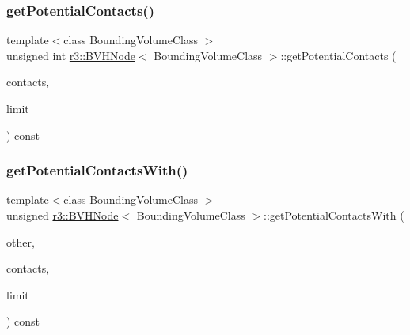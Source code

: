 \subsubsection{\texorpdfstring{get\+Potential\+Contacts()}{getPotentialContacts()}}
{\footnotesize\ttfamily template$<$class Bounding\+Volume\+Class $>$ \\
unsigned int \mbox{\hyperlink{classr3_1_1_b_v_h_node}{r3\+::\+B\+V\+H\+Node}}$<$ Bounding\+Volume\+Class $>$\+::get\+Potential\+Contacts (\begin{DoxyParamCaption}\item[{\mbox{\hyperlink{structr3_1_1_potential_contacts}{Potential\+Contacts}} $\ast$}]{contacts,  }\item[{unsigned int}]{limit }\end{DoxyParamCaption}) const}

\mbox{\label{classr3_1_1_b_v_h_node_aca88cf5bd4b1c4981198cec816f122e8}} 
\subsubsection{\texorpdfstring{get\+Potential\+Contacts\+With()}{getPotentialContactsWith()}}
{\footnotesize\ttfamily template$<$class Bounding\+Volume\+Class $>$ \\
unsigned \mbox{\hyperlink{classr3_1_1_b_v_h_node}{r3\+::\+B\+V\+H\+Node}}$<$ Bounding\+Volume\+Class $>$\+::get\+Potential\+Contacts\+With (\begin{DoxyParamCaption}\item[{\mbox{\hyperlink{classr3_1_1_b_v_h_node}{B\+V\+H\+Node}}$<$ Bounding\+Volume\+Class $>$ $\ast$}]{other,  }\item[{\mbox{\hyperlink{structr3_1_1_potential_contacts}{Potential\+Contacts}} $\ast$}]{contacts,  }\item[{unsigned}]{limit }\end{DoxyParamCaption}) const\hspace{0.3cm}{\ttfamily [protected]}}

\mbox{\label{classr3_1_1_b_v_h_node_ab6f91727e36689a7edc9f8c168ab904b}} 
